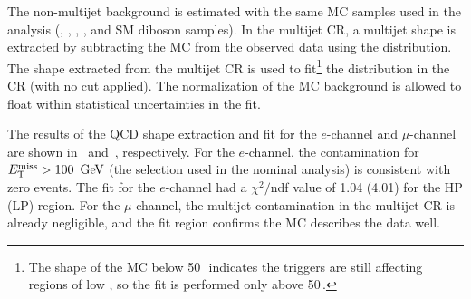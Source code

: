 The non-multijet background is estimated with the same MC samples used in the analysis (\Wjets, \Zjets, \ttbar, \Singlet, and SM diboson samples). In the multijet CR, a multijet shape is extracted by subtracting the MC from the observed data using the \MET distribution. The shape extracted from the multijet CR is used to fit\footnote{
The shape of the MC below 50\,\GeV\, indicates the triggers are still affecting regions of low \MET, so the fit is performed only above 50\,\GeV.
} the \MET distribution in the \Wjets CR (with no \MET cut applied). The normalization of the MC background is allowed to float within statistical uncertainties in the fit. 

The results of the QCD shape extraction and fit for the $e$-channel and $\mu$-channel are shown in~\Fig{\ref{fig:qcdshape_fit_el}} and~\Fig{\ref{fig:qcdshape_fit_mu}}, respectively. For the $e$-channel, the contamination for $\MET>100\,\GeV$ (the selection used in the nominal analysis) is consistent with zero events. The fit for the $e$-channel had a $\chi^2/$ndf value of 1.04 (4.01) for the HP (LP) region. For the $\mu$-channel, the multijet contamination in the multijet CR is already negligible, and the fit region confirms the MC describes the data well.
